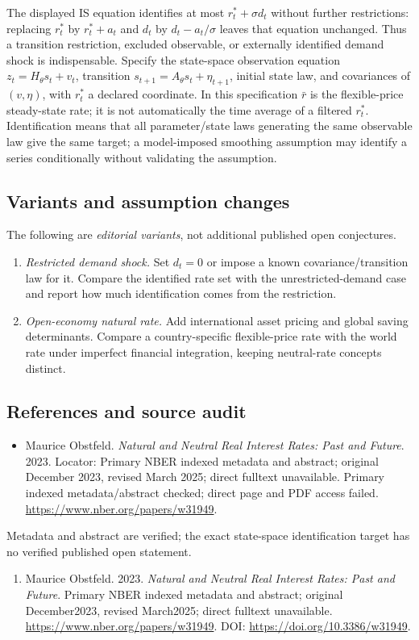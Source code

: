 \documentclass[11pt,a4paper]{article}
\begin{document}
The displayed IS equation identifies at most \(r_t^*+\sigma d_t\) without further restrictions: replacing \(r_t^*\) by \(r_t^*+a_t\) and \(d_t\) by \(d_t-a_t/\sigma\) leaves that equation unchanged. Thus a transition restriction, excluded observable, or externally identified demand shock is indispensable. Specify the state-space observation equation \(z_t=H_\theta s_t+v_t\), transition \(s_{t+1}=A_\theta s_t+\eta_{t+1}\), initial state law, and covariances of \((v,\eta)\), with \(r_t^*\) a declared coordinate. In this specification \(\bar r\) is the flexible-price steady-state rate; it is not automatically the time average of a filtered \(r_t^*\). Identification means that all parameter/state laws generating the same observable law give the same target; a model-imposed smoothing assumption may identify a series conditionally without validating the assumption.
\subsection*{Variants and assumption changes}
The following are \emph{editorial variants}, not additional published open conjectures.
\begin{enumerate}
\item \emph{Restricted demand shock.} Set \(d_t=0\) or impose a known covariance/transition law for it. Compare the identified rate set with the unrestricted-demand case and report how much identification comes from the restriction.
\item \emph{Open-economy natural rate.} Add international asset pricing and global saving determinants. Compare a country-specific flexible-price rate with the world rate under imperfect financial integration, keeping neutral-rate concepts distinct.
\end{enumerate}
\subsection*{References and source audit}
\begin{itemize}
\item Maurice Obstfeld. \emph{Natural and Neutral Real Interest Rates: Past and Future}. 2023. Locator: Primary NBER indexed metadata and abstract; original December 2023, revised March 2025; direct fulltext unavailable. Primary indexed metadata/abstract checked; direct page and PDF access failed. \url{https://www.nber.org/papers/w31949}.
\end{itemize}
Metadata and abstract are verified; the exact state-space identification target has no verified published open statement.
\begin{enumerate}\raggedright
\item\hypertarget{definitions:source:30007526:1}{} Maurice Obstfeld. 2023. \emph{Natural and Neutral Real Interest Rates: Past and Future}. Primary NBER indexed metadata and abstract; original December2023, revised March2025; direct fulltext unavailable.
\url{https://www.nber.org/papers/w31949}.
DOI: \url{https://doi.org/10.3386/w31949}.
\end{enumerate}
\end{document}
